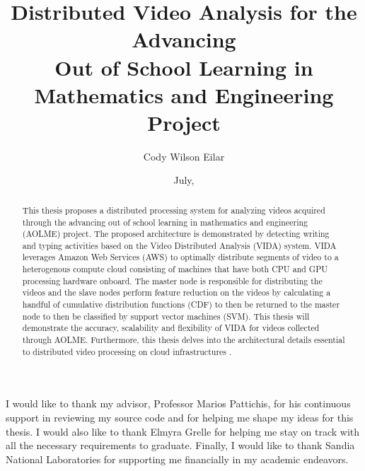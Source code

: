 \documentclass[botnum, fleqn]{unmeethesis}
\begin{document}
  \frontmatter



  \title{Distributed Video Analysis for the  Advancing  \\
  Out of School Learning in Mathematics and Engineering Project}

  \author{Cody Wilson Eilar}
  \date{July, \thisyear}

  \maketitle



  \begin{acknowledgments}
    \vspace{1.1in}
    I would like to thank my advisor, Professor Marios Pattichis, for his
    continuous support in reviewing my source code and for helping me shape my
    ideas for this thesis. I would also like to thank Elmyra Grelle for helping
    me stay on track with all the necessary requirements to graduate. Finally, I
    would like to thank Sandia National Laboratories for supporting me
    financially in my academic endeavors.
  \end{acknowledgments}

  \maketitleabstract %

  \begin{abstract}
    This thesis proposes a distributed processing system for analyzing
    videos acquired through the advancing out of school learning in
    mathematics and engineering (AOLME) project. The
    proposed architecture is demonstrated by detecting writing and typing
    activities based on the Video Distributed Analysis (VIDA) system. VIDA
    leverages Amazon Web Services (AWS) to optimally distribute segments of
    video to a heterogenous compute cloud consisting of machines that have both
    CPU and GPU processing hardware onboard. The master node is responsible for
    distributing the videos and the slave nodes perform feature reduction on the
    videos by calculating a handful of cumulative distribution functions (CDF)
    to then be returned to the master node to then be classified by support vector
    machines (SVM). This thesis will demonstrate the accuracy,
    scalability and flexibility of VIDA for videos collected through AOLME. Furthermore,
    this thesis delves into the architectural details essential to distributed
    video processing on cloud infrastructures .

    \clearpage %
  \end{abstract}
\end{document}
